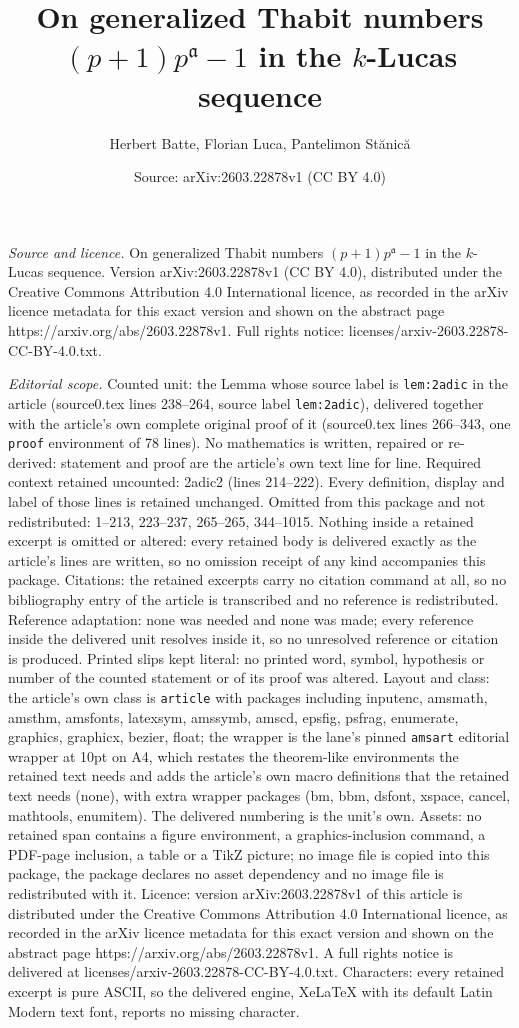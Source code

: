\documentclass[10pt,a4paper]{amsart}
\title[On generalized Thabit numbers $(p+1)p^\mathfrak{a}-1$ in the]{On generalized Thabit numbers $(p+1)p^\mathfrak{a}-1$ in the $k$-Lucas sequence}
\author{Herbert Batte, Florian Luca, Pantelimon St\u{a}nic\u{a}}
\date{Source: arXiv:2603.22878v1 (CC BY 4.0)}
\begin{document}
\maketitle

\noindent\emph{Source and licence.} On generalized Thabit numbers $(p+1)p^\mathfrak{a}-1$ in the $k$-Lucas sequence. Version arXiv:2603.22878v1 (CC BY 4.0), distributed under the Creative Commons Attribution 4.0 International licence, as recorded in the arXiv licence metadata for this exact version and shown on the abstract page https://arxiv.org/abs/2603.22878v1. Full rights notice: licenses/arxiv-2603.22878-CC-BY-4.0.txt.\par\smallskip

\noindent\textit{Editorial scope.} Counted unit: the Lemma whose source label is \texttt{lem:2adic} in the article (source0.tex lines 238--264, source label \texttt{lem:2adic}), delivered together with the article's own complete original proof of it (source0.tex lines 266--343, one \texttt{proof} environment of 78 lines). No mathematics is written, repaired or re-derived: statement and proof are the article's own text line for line. Required context retained uncounted: 2adic2 (lines 214--222). Every definition, display and label of those lines is retained unchanged. Omitted from this package and not redistributed: 1--213, 223--237, 265--265, 344--1015. Nothing inside a retained excerpt is omitted or altered: every retained body is delivered exactly as the article's lines are written, so no omission receipt of any kind accompanies this package. Citations: the retained excerpts carry no citation command at all, so no bibliography entry of the article is transcribed and no reference is redistributed. Reference adaptation: none was needed and none was made; every reference inside the delivered unit resolves inside it, so no unresolved reference or citation is produced. Printed slips kept literal: no printed word, symbol, hypothesis or number of the counted statement or of its proof was altered. Layout and class: the article's own class is \texttt{article} with packages including inputenc, amsmath, amsthm, amsfonts, latexsym, amssymb, amscd, epsfig, psfrag, enumerate, graphics, graphicx, bezier, float; the wrapper is the lane's pinned \texttt{amsart} editorial wrapper at 10pt on A4, which restates the theorem-like environments the retained text needs and adds the article's own macro definitions that the retained text needs (none), with extra wrapper packages (bm, bbm, dsfont, xspace, cancel, mathtools, enumitem). The delivered numbering is the unit's own. Assets: no retained span contains a figure environment, a graphics-inclusion command, a PDF-page inclusion, a table or a TikZ picture; no image file is copied into this package, the package declares no asset dependency and no image file is redistributed with it. Licence: version arXiv:2603.22878v1 of this article is distributed under the Creative Commons Attribution 4.0 International licence, as recorded in the arXiv licence metadata for this exact version and shown on the abstract page https://arxiv.org/abs/2603.22878v1. A full rights notice is delivered at licenses/arxiv-2603.22878-CC-BY-4.0.txt. Characters: every retained excerpt is pure ASCII, so the delivered engine, XeLaTeX with its default Latin Modern text font, reports no missing character.
\end{document}
